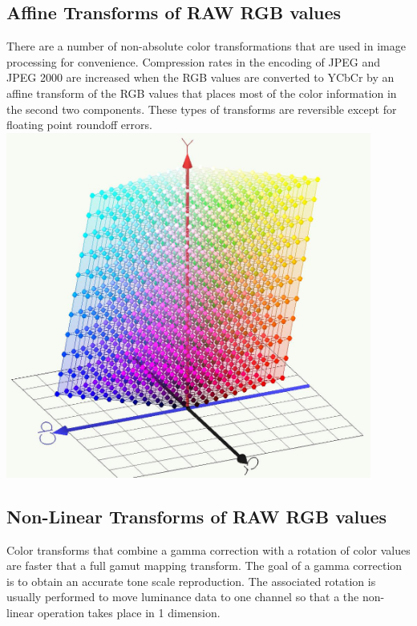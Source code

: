 \documentclass{amsart}
\theoremstyle{definition}
\theoremstyle{remark}
\numberwithin{equation}{section}
\begin{document}
\subsection{Affine Transforms of RAW RGB values}
There are a number of non-absolute color transformations that are used in image processing for convenience.  Compression rates in the encoding of JPEG and JPEG 2000 are increased when the RGB values are converted to YCbCr by an affine transform of the RGB values that places most of the color information in the second two components.
These types of transforms are reversible except for floating point roundoff errors.
\includegraphics[width=12.0cm]{RGB_TO_YCBCR.jpg}

\subsection{Non-Linear Transforms of RAW RGB values}
Color transforms that combine a gamma correction with a rotation of color values are faster that a full gamut mapping transform. The goal of a gamma correction is to obtain an accurate tone scale reproduction.  The associated rotation is usually performed to move luminance data to one channel so that a the non-linear operation takes place in 1 dimension.



\end{document}

